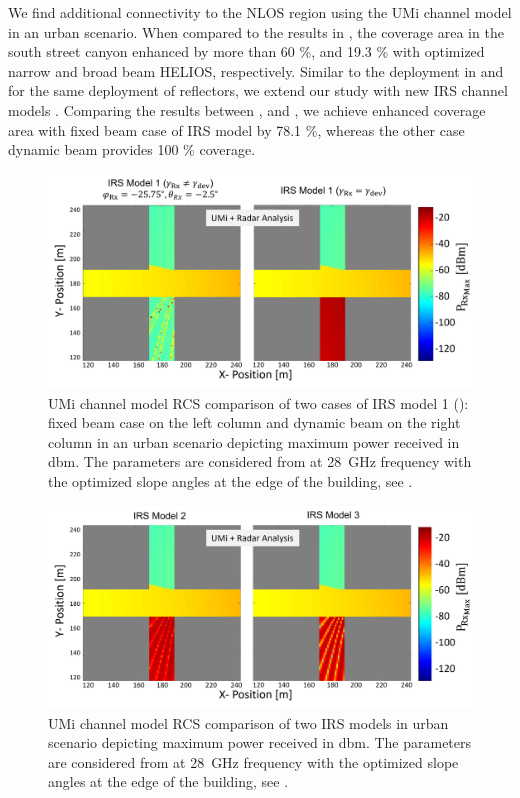 We find additional connectivity to the NLOS region using the UMi channel model in an urban scenario. When compared to the results in , the coverage area in the south street canyon enhanced by more than \num{60} \%, and \num{19.3} \% with optimized narrow and broad beam HELIOS, respectively. Similar to the deployment in  and for the same deployment of reflectors, we extend our study with new IRS channel models . Comparing the results between , and , we achieve enhanced coverage area with fixed beam case of IRS model by \num{78.1} \%, whereas the other case dynamic beam provides \num{100} \% coverage. 

\begin{figure}[H]
	\centering
	\includegraphics[width=0.83\linewidth]{images/Section 4 Images/UMi_IRS_MOdel1}
	\caption{UMi channel model RCS comparison of two cases of IRS model 1 (): fixed beam case on the left column and dynamic beam on the right column in an urban scenario depicting maximum power received in \si{\decibel}m. The parameters are considered from  at \SI{28}{\giga\hertz} frequency with the optimized slope angles at the edge of the building, see .}
	\label{fig:UMi_IRS_MOdel1}
\end{figure}
\begin{figure}[H]
	\centering
	\includegraphics[width=0.83\linewidth]{images/Section 4 Images/UMi_IRS_MOdel2_3}
	\caption{UMi channel model RCS comparison of two IRS models  in urban scenario depicting maximum power received in \si{\decibel}m. The parameters are considered from  at \SI{28}{\giga\hertz} frequency with the optimized slope angles at the edge of the building, see .}
	\label{fig:UMi_IRS_MOdel2_3}
\end{figure}
